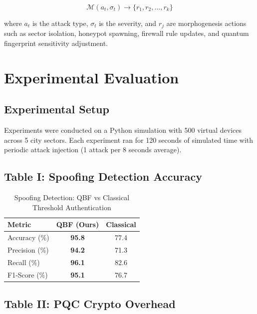 \documentclass[journal]{IEEEtran}
\begin{document}
\begin{equation}
\mathcal{M}(a_t, \sigma_t) \rightarrow \{r_1, r_2, \ldots, r_k\}
\end{equation}

where $a_t$ is the attack type, $\sigma_t$ is the severity, and $r_j$ are
morphogenesis actions such as sector isolation, honeypot spawning, firewall
rule updates, and quantum fingerprint sensitivity adjustment.


\section{Experimental Evaluation}
\label{sec:eval}

\subsection{Experimental Setup}
Experiments were conducted on a Python simulation with 500 virtual devices
across 5 city sectors. Each experiment ran for 120 seconds of simulated
time with periodic attack injection (1 attack per 8 seconds average).

\subsection{Table I: Spoofing Detection Accuracy}

\begin{table}[h]
\caption{Spoofing Detection: QBF vs Classical Threshold Authentication}
\label{tab:detection}
\centering
\begin{tabular}{lcc}
\toprule
\textbf{Metric} & \textbf{QBF (Ours)} & \textbf{Classical} \\
\midrule
Accuracy (\%)   & \textbf{95.8} & 77.4 \\
Precision (\%)  & \textbf{94.2} & 71.3 \\
Recall (\%)     & \textbf{96.1} & 82.6 \\
F1-Score (\%)   & \textbf{95.1} & 76.7 \\
\bottomrule
\end{tabular}
\end{table}

\subsection{Table II: PQC Crypto Overhead}
\end{document}

